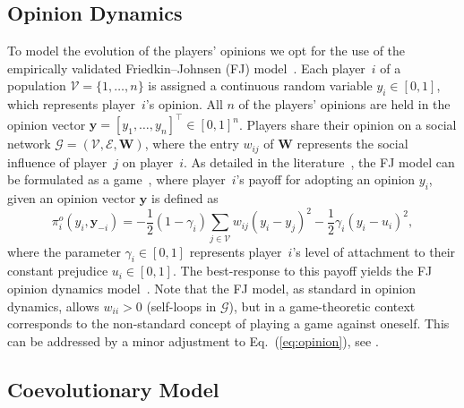 \documentclass[letterpaper, 10 pt, conference]{ieeeconf}  %
\newcommand{\vect}[1]{\boldsymbol{#1}}
\newcommand{\mat}[1]{\boldsymbol{#1}}
\renewcommand{\eqref}[1]{Eq.~(\ref{#1})}  %
\begin{document}
\subsection{Opinion Dynamics}
To model the evolution of the players' opinions we opt for the use of the empirically validated Friedkin--Johnsen (FJ) model~\cite{friedkin_social_1990}. Each player~$i$ of a population $\mathcal V=\{1,\dots,n\}$ is assigned a continuous random variable $y_i\in [0,1]$, which represents player~$i$'s opinion. All $n$ of the players' opinions are held in the opinion vector $\vect{y}=[y_1, \dots, y_n]^\top \in [0,1]^n$. Players share their opinion on a social network $\mathcal G=(\mathcal V, \mathcal E,\mat W)$, where the entry $w_{ij}$ of $\mat W$ represents the social influence of player~$j$ on player~$i$. As detailed in the literature~\cite{proskurnikov_tutorial_2017}, the FJ model can be formulated as a game~\cite{ghaderi_opinion_2014}, where player~$i$'s payoff for adopting an opinion ${y}_i$, given an opinion vector $\vect y$ is defined as
\begin{equation}\label{eq:opinion}
    \pi_i^{o}(y_i,\vect{y}_{-i}) = -\dfrac{1}{2}(1-\gamma_i)\sum_{j \in \mathcal{V}}w_{ij}(y_i - y_j)^2 - \dfrac{1}{2}\gamma_i(y_i - u_i)^2,
\end{equation}
where the parameter $\gamma_i\in[0,1]$ represents player~$i$'s level of attachment to their constant prejudice $u_i\in[0,1]$. The best-response to this payoff yields the FJ opinion dynamics model~\cite{friedkin_social_1990}. Note that the FJ model, as standard in opinion dynamics, allows $w_{ii} > 0$ (self-loops in $\mathcal G$), but in a game-theoretic context corresponds to the non-standard concept of playing a game against oneself. This can be addressed by a minor adjustment to \eqref{eq:opinion}, see \cite{aghbolagh_coevolutionary_2023}. 

\subsection{Coevolutionary Model}
\end{document}
